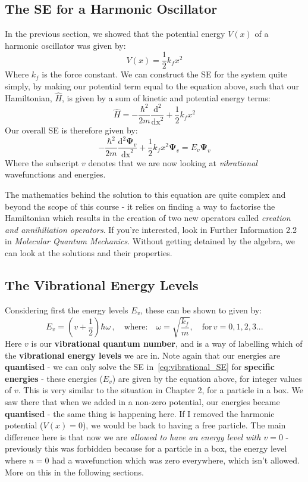 \documentclass{memoir}[11pt,oneside,a4paper,openany]
\newcommand{\wf}{\ensuremath{\bm{\Psi}}\xspace}
\begin{document}
\subsection{The SE for a Harmonic Oscillator}
In the previous section, we showed that the potential energy $V(x)$ of a harmonic oscillator was given by:
\begin{equation}
	V(x) = \frac{1}{2} k_fx^2
\end{equation}
Where $k_f$ is the force constant. We can construct the SE for the system quite simply, by making our potential term equal to the equation above, such that our Hamiltonian, $\hat{H}$, is given by a sum of kinetic and potential energy terms:
\begin{equation}
	\hat{H} = -\frac{\hbar^2}{2m}\frac{\mathrm{d}^2}{\mathrm{dx}^2} + \frac{1}{2}k_fx^2
\end{equation}
Our overall SE is therefore given by:
\begin{equation}\label{eq:vibrational_SE}
	-\frac{\hbar^2}{2m}\frac{\mathrm{d}^2\wf_v}{\mathrm{dx}^2} + \frac{1}{2}k_fx^2\wf_v = E_v\wf_v
\end{equation}
Where the subscript $v$ denotes that we are now looking at \emph{vibrational} wavefunctions and energies.

The mathematics behind the solution to this equation are quite complex and beyond the scope of this course - it relies on finding a way to factorise the Hamiltonian which results in the creation of two new operators called \emph{creation and annihiliation operators}. If you're interested, look in Further Information 2.2 in \emph{Molecular Quantum Mechanics}. Without getting detained by the algebra, we can look at the solutions and their properties. 

\subsection{The Vibrational Energy Levels}
Considering first the energy levels $E_v$, these can be shown to given by:
\begin{equation}\label{eq:vibrational_energies}
	E_v = (v+\frac{1}{2})\hbar\omega\,,\quad \text{where:}\quad \omega = \sqrt{\frac{k_f}{m}},\quad\text{for}\, v=0,1,2,3...
\end{equation}
Here $v$ is our \textbf{vibrational quantum number}, and is a way of labelling which of the \textbf{vibrational energy levels} we are in. Note again that our energies are \textbf{quantised} - we can only solve the SE in~\autoref{eq:vibrational_SE} for \textbf{specific energies} - these energies ($E_v$) are given by the equation above, for integer values of $v$. This is very similar to the situation in Chapter 2, for a particle in a box. We saw there that when we added in a non-zero potential, our energies became \textbf{quantised} - the same thing is happening here. If I removed the harmonic potential ($V(x)=0$), we would be back to having a free particle. The main difference here is that now we are \emph{allowed to have an energy level with $v=0$} - previously this was forbidden because for a particle in a box, the energy level where $n=0$ had a wavefunction which was zero everywhere, which isn't allowed. More on this in the following sections. 
\end{document}
